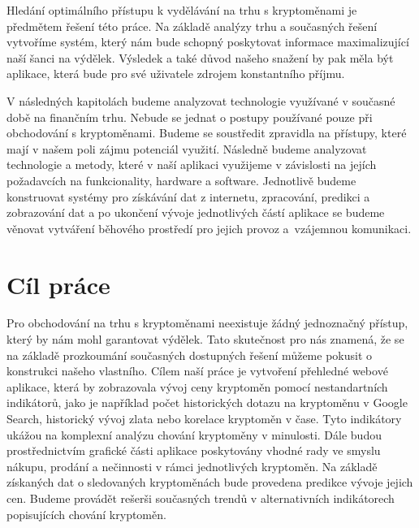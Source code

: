 Hledání optimálního přístupu k vydělávání na trhu s kryptoměnami je předmětem řešení této práce. 
Na základě analýzy trhu a současných řešení vytvoříme systém, který nám bude schopný poskytovat informace maximalizující naší šanci na výdělek.
Výsledek a také důvod našeho snažení by pak měla být aplikace, která bude pro své uživatele zdrojem konstantního příjmu.

V následných kapitolách budeme analyzovat technologie využívané v současné době na finančním trhu. 
Nebude se jednat o postupy používané pouze při obchodování s kryptoměnami.
Budeme se soustředit zpravidla na přístupy, které mají v našem poli zájmu potenciál využití.
Následně budeme analyzovat technologie a metody, které v naší aplikaci využijeme v závislosti na jejích požadavcích na funkcionality, hardware a software.
Jednotlivě budeme konstruovat systémy pro získávání dat z internetu, zpracování, predikci a zobrazování dat a po ukončení vývoje jednotlivých částí aplikace se budeme věnovat vytváření běhového prostředí pro jejich provoz a~vzájemnou komunikaci.

\chapter*{Cíl práce}

Pro obchodování na trhu s kryptoměnami neexistuje žádný jednoznačný přístup, který by nám mohl garantovat výdělek.
Tato skutečnost pro nás znamená, že se na základě prozkoumání současných dostupných řešení můžeme pokusit o konstrukci našeho vlastního. 
Cílem naší práce je vytvoření přehledné webové aplikace, která by zobrazovala vývoj ceny kryptoměn pomocí nestandartních indikátorů, jako je například počet historických dotazu na kryptoměnu v Google Search, historický vývoj zlata nebo korelace kryptoměn v čase.
Tyto indikátory ukážou na komplexní analýzu chování kryptoměny v minulosti.
Dále budou prostřednictvím grafické části aplikace poskytovány vhodné rady ve smyslu nákupu, prodání a nečinnosti v rámci jednotlivých kryptoměn.
Na základě získaných dat o sledovaných kryptoměnách bude provedena predikce vývoje jejich cen.
Budeme provádět rešerši současných trendů v alternativních indikátorech popisujících chování kryptoměn.

